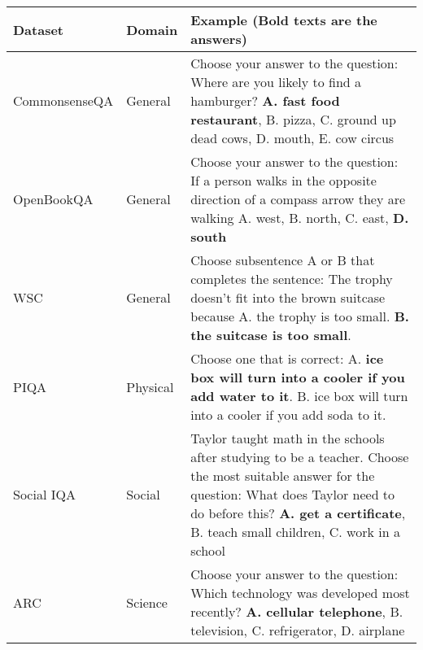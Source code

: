 \begin{table}[h!]
	\small
	\centering
	\begin{tabularx}{\textwidth}{|l|l|X|}
		\hline
		Dataset       & Domain       & Example (Bold texts are the answers)                                                                                                                                                                                                                                     \\
		\hline
		CommonsenseQA & General      & Choose your answer to the question: Where are you likely to find a hamburger? \textbf{A. fast food restaurant}, B. pizza, C. ground up dead cows, D. mouth, E. cow circus                                                                                                \\
		\hline
		OpenBookQA    & General      & Choose your answer to the question: If a person walks in the opposite direction of a compass arrow they are walking A. west, B. north, C. east, \textbf{D. south}                                                                                                        \\
		\hline
		WSC           & General      & Choose subsentence A or B that completes the sentence: The trophy doesn’t fit into the brown suitcase because A. the trophy is too small. \textbf{B. the suitcase is too small}.                                                                                         \\
		\hline
		PIQA          & Physical     & Choose one that is correct: A. \textbf{ice box will turn into a cooler if you add water to it}. B. ice box will turn into a cooler if you add soda to it.                                                                                                                \\
		\hline
		Social IQA    & Social       & Taylor taught math in the schools after studying to be a teacher. Choose the most suitable answer for the question: What does Taylor need to do before this? \textbf{A. get a certificate}, B. teach small children, C. work in a school                                 \\
		\hline
		ARC           & Science      & Choose your answer to the question: Which technology was developed most recently? \textbf{A. cellular telephone}, B. television, C. refrigerator, D. airplane                                                                                                            \\

\end{tabularx}
\end{table}
